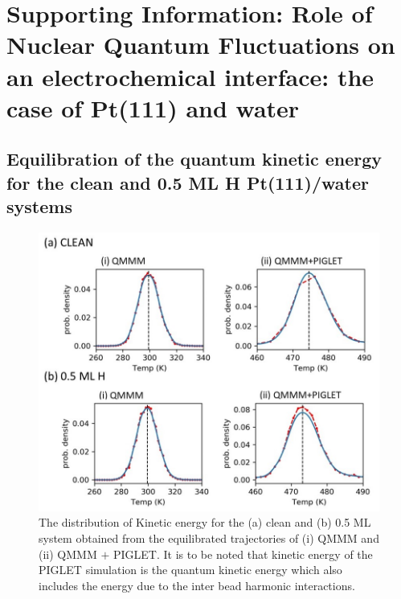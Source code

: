 \chapter{Supporting Information: Role of Nuclear Quantum Fluctuations on an electrochemical interface: the case of Pt(111) and water} \label{appendix5}

\section{Equilibration of the quantum kinetic energy for the clean and 0.5 ML H Pt(111)/water systems}


\begin{figure}
   \begin{center}
    \includegraphics[width=14cm]{./Chapter3/figures/Slide14.JPG}       
   \end{center}
    \caption{The distribution of Kinetic energy for the (a) clean and (b) 0.5 ML system obtained from the equilibrated trajectories of (i) QMMM and (ii) QMMM $+$ PIGLET. It is to be noted that kinetic energy of the PIGLET simulation is the quantum kinetic energy which also includes the energy due to the inter bead harmonic interactions.}
  \label{fig:Slide14}
\end{figure}

